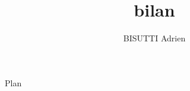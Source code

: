 \documentclass{beamer}
\title{bilan}
\author{BISUTTI Adrien}
\begin{document}
\begin{frame}
	\titlepage
\end{frame}


\begin{frame}{Plan}
	\tableofcontents[hidesubsection]
\end{frame}


\begin{frame}{}
	
\end{frame}
\end{document}
